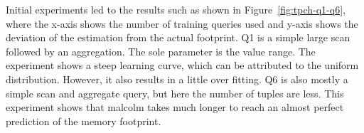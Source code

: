 \documentclass[conference]{IEEEtran}
\begin{document}
Initial experiments led to the results such as shown in Figure~\ref{fig:tpch-q1-q6}, where the x-axis shows the number of training queries used and y-axis shows the deviation of the estimation from the actual footprint.
Q1 is a simple large scan followed by an aggregation. The sole parameter is the value range.
The experiment shows a steep learning curve, which can be attributed to the uniform distribution.
However, it also results in a little over fitting.
Q6 is also mostly a simple scan and aggregate query, but here the number of tuples are less.
This experiment shows that {\sc malcolm} takes much longer to reach an almost perfect prediction of the memory footprint.


\end{document}
